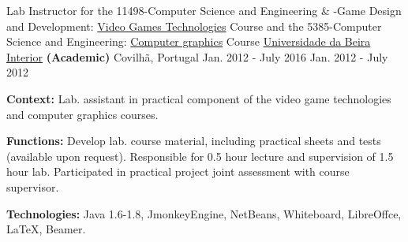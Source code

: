 \begin{cventries}
  \cventry
    {Lab Instructor for the
        11498-Computer Science and Engineering \& -Game Design and Development: 
		\href{http://www.di.ubi.pt/~agomes/tjv/}{Video Games Technologies}	Course 
		\linebreak and the
		5385-Computer Science and Engineering: 		
		\href{http://www.di.ubi.pt/~agomes/cg/}{Computer graphics} Course} %
    {\href{http://www.ubi.pt}{Universidade da Beira Interior} \textbf{(Academic)}} %
    {Covilh\~a, Portugal} %
    {\linebreak Jan. 2012 - July 2016 \linebreak Jan. 2012 - July 2012} %
    {
      \begin{cvitems} %
		\item {\textbf{Context:} Lab. assistant in practical component of the video game technologies and computer graphics courses.}
		\item {\textbf{Functions:} Develop lab. course material, including practical sheets and tests (available upon request). Responsible for 0.5 hour lecture and supervision of 1.5 hour lab. Participated in practical project joint assessment with course supervisor.}
		\item {\textbf{Technologies:} Java 1.6-1.8, JmonkeyEngine, NetBeans, Whiteboard, LibreOffce, LaTeX, Beamer.} %
      \end{cvitems}
    }       
    

\end{cventries}
